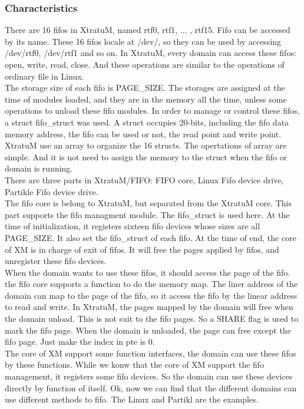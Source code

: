 \subsubsection{Characteristics}
There are 16 fifos in XtratuM, named rtf0, rtf1, ... , rtf15. Fifo can be accessed by its name. These 16 fifos locale at /dev/, so they can be used by accessing /dev/rtf0, /dev/rtf1 and so on. In XtratuM, every domain can access these fifos: open, write, read, close. And these operations are similar to the operations of ordinary file in Linux.
\\
The storage size of each fifo is PAGE\_SIZE. The storages are assigned at the time of modules loaded, and they are in the memory all the time, unless some operations to unload these fifo modules. In order to manage or control these fifos, a struct fifo\_struct was used. A struct occupies 20-bits, including the fifo data memory address, the fifo can be used or not, the read point and write point. XtratuM use an array to organize the 16 structs. The opertations of array are simple. And it is not need to assign the memory to the struct when the fifo or domain is running.
\\
There are three parts in XtratuM/FIFO: FIFO core, Linux Fifo device drive, Partikle Fifo device drive. 
\\
The fifo core is belong to XtratuM, but separated from the XtratuM core. This part supports the fifo managment module. The fifo\_struct is used here. At the time of initialization, it registers sixteen fifo devices whose sizes are all PAGE\_SIZE. It also set the fifo\_struct of each fifo. At the time of end, the core of XM is in charge of exit of fifos. It will free the pages applied by fifos, and unregister these fifo devices. 
\\
When the domain wants to use these fifos, it should access the page of the fifo. the fifo core supports a function to do the memory map. The liner address of the domain can map to the page of the fifo, so it access the fifo by the linear address to read and write. In XtratuM, the pages mapped by the domain will free when the domain unload. This is not suit to the fifo pages. So a SHARE flag is used to mark the fifo page. When the domain is unloaded, the page can free except the fifo page. Just make the index in pte is 0.
\\
The core of XM support some function interfaces, the domain can use these fifos by these functions. While we konw that the core of XM support the fifo management, it registers some fifo devices. So the domain can use these devices directly by function of itself. Ok, now we can find that the different domains can use different methods to fifo. The Linux and Partikl are the examples.
